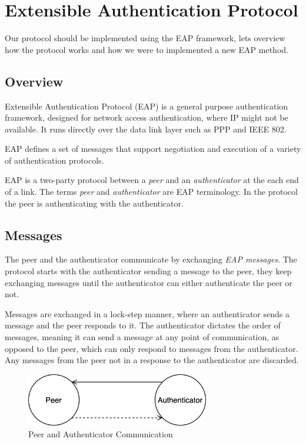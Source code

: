\section{Extensible Authentication Protocol}
\label{section:eap}
Our protocol should be implemented using the EAP framework, lets overview how the protocol works and how we were to implemented a new EAP method.



\subsection{Overview}
Extensible Authentication Protocol \cite{aboba2004extensible} (EAP) is a general purpose authentication framework, designed for network access authentication, where IP might not be available. 
It runs directly over the data link layer such as PPP  \cite{simpson1994rfc1661} and IEEE 802.

EAP defines a set of messages that support negotiation and execution of a variety of authentication protocols.

EAP is a two-party protocol between a \textit{peer} and an \textit{authenticator} at the each end of a link. The terms \textit{peer} and \textit{authenticator} are EAP terminology.
In the protocol the peer is authenticating with the authenticator.

\subsection{Messages}
The peer and the authenticator communicate by exchanging \textit{EAP messages}.
The protocol starts with the authenticator sending a message to the peer, they keep exchanging messages until the authenticator can either authenticate the peer or not.

Messages are exchanged in a lock-step manner, where an authenticator sends a message and the peer responds to it. 
The authenticator dictates the order of messages, meaning it can send a message at any point of communication, as opposed to the peer, which can only respond to messages from the authenticator.
Any messages from the peer not in a response to the authenticator are discarded.

\begin{figure}[h]
	\centering
	\includegraphics[width=8cm]{images/eap-messages}
	\caption{Peer and Authenticator Communication}
	\label{fig:eap-messages}
\end{figure}

